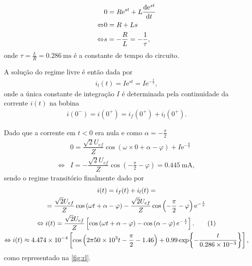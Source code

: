 \documentclass[a4paper, titlepage, portuguese]{article}
\newcommand{\eq}{\Leftrightarrow} %
\newcommand\numberthis{\addtocounter{equation}{1}\tag{\theequation}}
\newcommand\e{\mathrm{e} }
\begin{document}
		\begin{align*}
			&0 = R\e^{st} + L\dv{\e^{st}}{t} \\ \eq
			&0 = R + Ls \\ \eq
			&s = - \dfrac{R}{L} = - \dfrac{1}{\tau},
		\end{align*}
		onde $\tau = \frac{L}{R} = \SI{0.286}{\milli\second}$ é a constante de tempo do circuito. \\
		\par
		A solução do regime livre é então dada por
		\begin{align*}
			i_l(t) = I \e^{st} = I \e^{-\frac{t}{\tau}},
		\end{align*}
		onde a única constante de integração $I$ é determinada pela continuidade da corrente $i(t)$ na bobina
		\begin{align*}
			i(0^-) = i(0^+) = i_f(0^+) + i_l(0^+).
		\end{align*}
		\par
		Dado que a corrente em $t < 0$ era nula e como $\alpha = -\frac{\pi}{2}$
		\begin{align*}
			&0 =  \dfrac{\sqrt{2}U_{ef}}{Z} \cos\left(\omega \times 0 + \alpha - \varphi\right) + I \e^{-\frac{0}{\tau}} \\ \eq
			&I = - \dfrac{\sqrt{2}U_{ef}}{Z} \cos\left(- \frac{\pi}{2} - \varphi\right) = \SI{0.445}{\milli\ampere},
		\end{align*}
		sendo o regime transitório finalmente dado por
		\begin{gather*}
			i(t) = i_f(t) + i_l(t) = \\ =
			\dfrac{\sqrt{2}U_{ef}}{Z} \cos\left(\omega t + \alpha - \varphi\right) - \dfrac{\sqrt{2}U_{ef}}{Z} \cos\left(- \frac{\pi}{2} - \varphi\right) \e^{-\frac{t}{\tau}} \\ \eq
			i(t) = \dfrac{\sqrt{2}U_{ef}}{Z} \left[ \cos\left(\omega t + \alpha - \varphi\right) - \cos\left(\alpha - \varphi\right)e^{-\frac{t}{\tau}}\right] . \numberthis \label{eq:trans_RL_sol} \\ \eq
			i(t) \approx \num{4.474e-4} \left[ \cos\left(2\pi\num{50e3}t - \frac{\pi}{2} - 1.46\right) + 0.99\exp{-\frac{t}{\num{0.286e-3}}}\right],
		\end{gather*}
		como representado na \autoref{fig:rl}.
\end{document}

